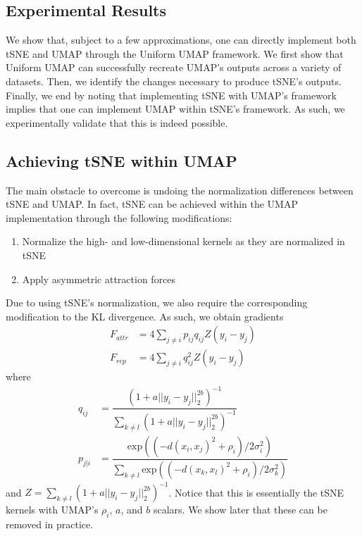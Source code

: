 \documentclass{article}
\theoremstyle{definition}
\begin{document}
\begin{multicols}{2}
\section{Experimental Results}
We show that, subject to a few approximations, one can directly implement both tSNE and UMAP through the Uniform UMAP framework. We first show that Uniform UMAP
can successfully recreate UMAP's outputs across a variety of datasets. Then, we identify the changes necessary to produce tSNE's outputs. Finally, we end by
noting that implementing tSNE with UMAP's framework implies that one can implement UMAP within tSNE's framework. As such, we experimentally validate that
this is indeed possible.

\subsection{Achieving tSNE within UMAP}
The main obstacle to overcome is undoing the normalization
differences between tSNE and UMAP. In fact, tSNE can be achieved within the UMAP implementation through the following modifications:
\begin{enumerate}
    \item Normalize the high- and low-dimensional kernels as they are normalized in tSNE
    \item Apply asymmetric attraction forces
\end{enumerate}
Due to using tSNE's normalization, we also require the corresponding modification to the KL divergence. As such, we obtain gradients
\begin{align*}
    F_{attr} &= 4 \sum_{j \neq i} p_{ij} q_{ij} Z (y_i - y_j) \\
   F_{rep} &= 4 \sum_{j \neq i} q_{ij}^2 Z (y_i - y_j)
\end{align*}
   where
\begin{align*}
   q_{ij} &= \dfrac{(1 + a ||y_i - y_j||_2^{2b})^{-1}}{\sum_{k \neq l} (1 + a ||y_i - y_j||_2^{2b})^{-1}} \\
    p_{j|i} &= \dfrac{\text{exp}( (-d(x_i, x_j)^2 + \rho_i) / 2 \sigma_i^2)}{\sum_{k \neq l} \text{exp}( (-d(x_k, x_l)^2 + \rho_i) / 2 \sigma_k^2)}
\end{align*}
   and $Z = \sum_{k \neq l} (1 + a ||y_i
   - y_j||_2^{2b})^{-1}$. Notice that this is essentially the tSNE kernels with UMAP's $\rho_i$, $a$, and $b$ scalars. We show later that these can be removed
   in practice.


\end{multicols}
\end{document}

